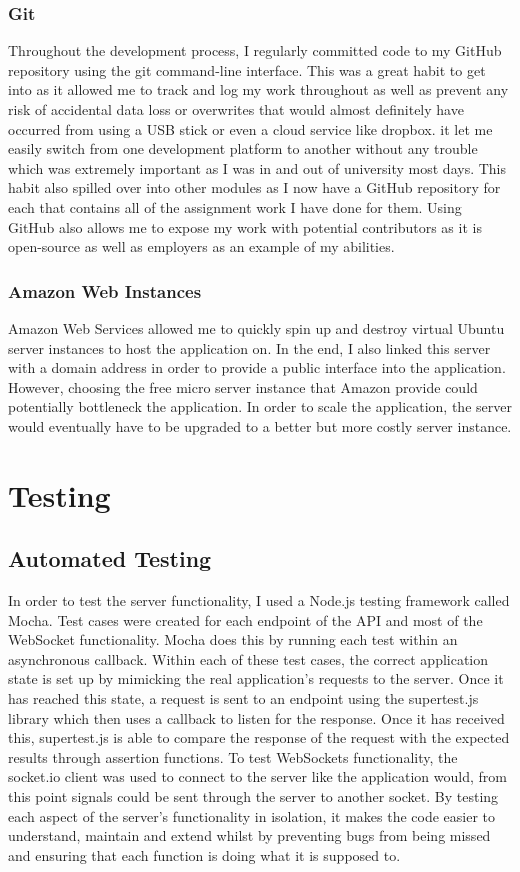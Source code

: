 \documentclass[]{report}
\begin{document}
			\subsection{Git}
			Throughout the development process, I regularly committed code to my GitHub repository using the git command-line interface. This was a great habit to get into as it allowed me to track and log my work throughout as well as prevent any risk of accidental data loss or overwrites that would almost definitely have occurred from using a USB stick or even a cloud service like dropbox. it let me easily switch from one development platform to another without any trouble which was extremely important as I was in and out of university most days. This habit also spilled over into other modules as I now have a GitHub repository for each that contains all of the assignment work I have done for them. Using GitHub also allows me to expose my work with potential contributors as it is open-source as well as employers as an example of my abilities. 
			
			\subsection{Amazon Web Instances}
			Amazon Web Services allowed me to quickly spin up and destroy virtual Ubuntu server instances to host the application on. In the end, I also linked this server with a domain address in order to provide a public interface into the application. However, choosing the free micro server instance that Amazon provide could potentially bottleneck the application. In order to scale the application, the server would eventually have to be upgraded to a better but more costly server instance.			

	\chapter{Testing}
		\section{Automated Testing}
			In order to test the server functionality, I used a Node.js testing framework called Mocha. Test cases were created for each endpoint of the API and most of the WebSocket functionality. Mocha does this by running each test within an asynchronous callback. Within each of these test cases, the correct application state is set up by mimicking the real application's requests to the server. Once it has reached this state, a request is sent to an endpoint using the supertest.js library which then uses a callback to listen for the response. Once it has received this, supertest.js is able to compare the response of the request with the expected results through assertion functions. To test WebSockets functionality, the socket.io client was used to connect to the server like the application would, from this point signals could be sent through the server to another socket. By testing each aspect of the server's functionality in isolation, it makes the code easier to understand, maintain and extend whilst by preventing bugs from being missed and ensuring that each function is doing what it is supposed to.
		
\end{document}
